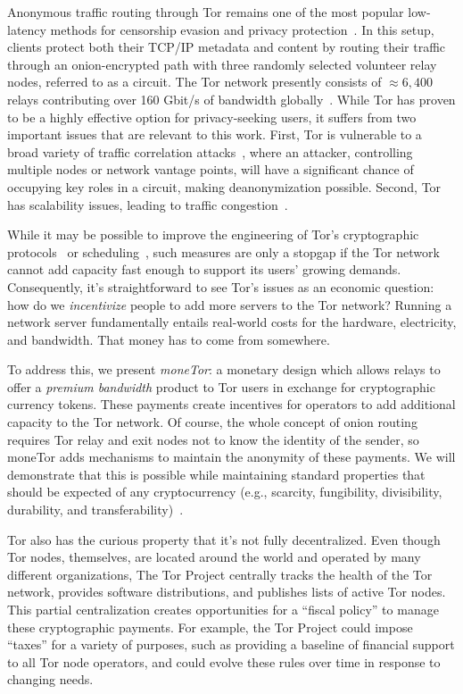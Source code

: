 Anonymous traffic routing through Tor remains one of the most popular low-latency methods for censorship evasion and privacy protection~\cite{dingledine2004tor}. In this setup, clients protect both their TCP/IP metadata and content by routing their traffic through an onion-encrypted path with three randomly selected volunteer relay nodes, referred to as a circuit. The Tor network presently consists of $\approx 6,400$ relays contributing over 160 Gbit/s of bandwidth globally~\cite{portal2018tormetrics}. While Tor has proven to be a highly effective option for privacy-seeking users, it suffers from two important issues that are relevant to this work.  First, Tor is vulnerable to a broad variety of traffic correlation attacks~\cite{wright2004predecessor,murdoch2005low}, where an attacker, controlling multiple nodes or network vantage points, will have a significant chance of occupying key roles in a circuit, making deanonymization possible. Second, Tor has scalability issues, leading to traffic congestion~\cite{portal2018tormetrics, alsabah2016performance}.

While it may be possible to improve the engineering of Tor's cryptographic protocols~\cite{reardon2009improving} or scheduling~\cite{jansen2014never}, such measures are only a stopgap if the Tor network cannot add capacity fast enough to support its users' growing demands. Consequently, it's straightforward to see Tor's issues as an economic question: how do we {\em incentivize} people to add more servers to the Tor network? Running a network server fundamentally entails real-world costs for the hardware, electricity, and bandwidth. That money has to come from somewhere.

To address this, we present {\em moneTor}: a monetary design which allows relays to offer a \emph{premium bandwidth} product to Tor users in exchange for cryptographic currency tokens. These payments create incentives for operators to add additional capacity to the Tor network. Of course, the whole concept of onion routing requires Tor relay and exit nodes not to know the identity of the sender, so moneTor adds mechanisms to maintain the anonymity of these payments. We will demonstrate that this is possible while maintaining standard properties that should be expected of any cryptocurrency (e.g., scarcity, fungibility, divisibility, durability, and transferability)~\cite[p.3]{crump2011phenomenon}.

Tor also has the curious property that it's not fully decentralized. Even though Tor nodes, themselves, are located around the world and operated by many different organizations, The Tor Project centrally tracks the health of the Tor network, provides software distributions, and publishes lists of active Tor nodes. This partial centralization creates opportunities for a ``fiscal policy'' to manage these cryptographic payments. For example, the Tor Project could impose ``taxes'' for a variety of purposes, such as providing a baseline of financial support to all Tor node operators, and could evolve these rules over time in response to changing needs.


